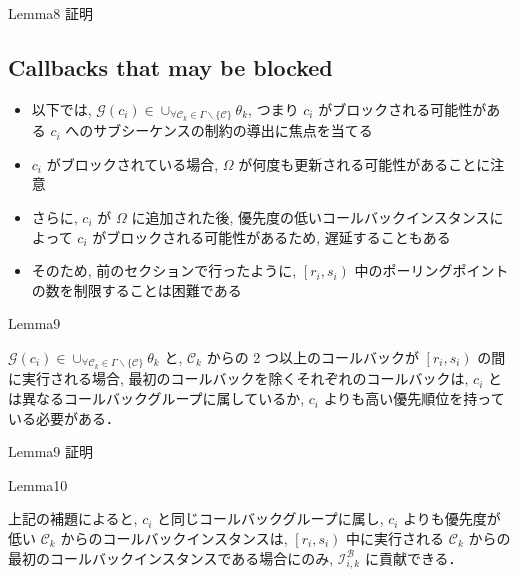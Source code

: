 \begin{frame}{Lemma8 証明}
    \todo{}
\end{frame}


\subsection{Callbacks that may be blocked}
\label{ssec: callbacks_that_may_be_blocked}

\begin{frame}{}
    \begin{itemize}
        \item 以下では, $\mathcal{G}\left(c_{i}\right) \in \cup_{\forall \mathcal{C}_{k} \in \Gamma \backslash\{\mathcal{C}\}} \theta_{k}$, つまり $c_{i}$ がブロックされる可能性がある $c_{i}$ へのサブシーケンスの制約の導出に焦点を当てる
        \item $c_{i}$ がブロックされている場合, $\Omega$ が何度も更新される可能性があることに注意
        \item さらに, $c_{i}$ が $\Omega$ に追加された後, 優先度の低いコールバックインスタンスによって $c_{i}$ がブロックされる可能性があるため, 遅延することもある
        \item そのため, 前のセクションで行ったように, $\left[r_{i}, s_{i}\right)$ 中のポーリングポイントの数を制限することは困難である
    \end{itemize}
\end{frame}

\begin{frame}{Lemma9}
    \begin{lemma}[]
        $\mathcal{G}\left(c_{i}\right) \in \cup_{\forall \mathcal{C}_{k} \in \Gamma \backslash\{\mathcal{C}\}} \theta_{k}$ と, $\mathcal{C}_{k}$ からの 2 つ以上のコールバックが $\left[r_{i}, s_{i}\right)$ の間に実行される場合, 最初のコールバックを除くそれぞれのコールバックは, $c_{i}$ とは異なるコールバックグループに属しているか, $c_{i}$ よりも高い優先順位を持っている必要がある．
    \end{lemma}
\end{frame}

\begin{frame}{Lemma9 証明}
    \todo{}
\end{frame}

\begin{frame}{Lemma10}
    \begin{lemma}[]
        上記の補題によると, $c_{i}$ と同じコールバックグループに属し, $c_{i}$ よりも優先度が低い $\mathcal{C}_{k}$ からのコールバックインスタンスは, $\left[r_{i}, s_{i}\right)$ 中に実行される $\mathcal{C}_{k}$ からの最初のコールバックインスタンスである場合にのみ, $\mathcal{I}_{i, k}^{\mathcal{B}}$ に貢献できる．
    \end{lemma}
\end{frame}
